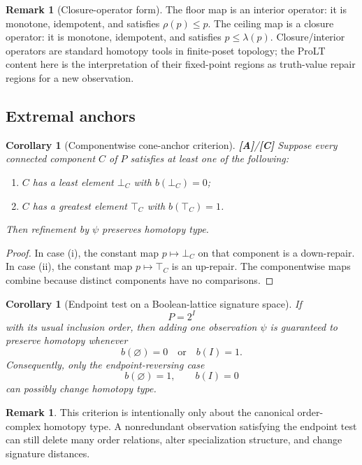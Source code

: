 \documentclass[11pt]{article}
\newtheorem{corollary}[theorem]{Corollary}
\theoremstyle{definition}
\newtheorem{remark}[theorem]{Remark}
\newcommand{\statusA}{\textbf{[A]}}
\newcommand{\statusC}{\textbf{[C]}}
\begin{document}
\begin{remark}[Closure-operator form]
The floor map is an interior operator: it is monotone, idempotent, and satisfies $\rho(p)\le p$. The ceiling map is a closure operator: it is monotone, idempotent, and satisfies $p\le\lambda(p)$. Closure/interior operators are standard homotopy tools in finite-poset topology; the ProLT content here is the interpretation of their fixed-point regions as truth-value repair regions for a new observation.
\end{remark}

\subsection{Extremal anchors}

\begin{corollary}[Componentwise cone-anchor criterion]\label{cor:anchor}
\statusA/\statusC\;
Suppose every connected component $C$ of $P$ satisfies at least one of the following:
\begin{enumerate}[label=(\roman*)]
\item $C$ has a least element $\bot_C$ with $b(\bot_C)=0$;
\item $C$ has a greatest element $\top_C$ with $b(\top_C)=1$.
\end{enumerate}
Then refinement by $\psi$ preserves homotopy type.
\end{corollary}

\begin{proof}
In case (i), the constant map $p\mapsto\bot_C$ on that component is a down-repair. In case (ii), the constant map $p\mapsto\top_C$ is an up-repair. The componentwise maps combine because distinct components have no comparisons.
\end{proof}

\begin{corollary}[Endpoint test on a Boolean-lattice signature space]\label{cor:endpoint}
If
\[
P=2^I
\]
with its usual inclusion order, then adding one observation $\psi$ is guaranteed to preserve homotopy whenever
\[
b(\varnothing)=0
\quad\text{or}\quad
b(I)=1.
\]
Consequently, only the endpoint-reversing case
\[
b(\varnothing)=1,
\qquad
b(I)=0
\]
can possibly change homotopy type.
\end{corollary}

\begin{remark}
This criterion is intentionally only about the canonical order-complex homotopy type. A nonredundant observation satisfying the endpoint test can still delete many order relations, alter specialization structure, and change signature distances.
\end{remark}
\end{document}
